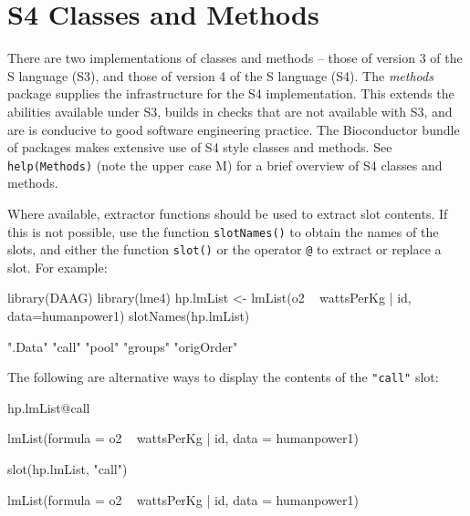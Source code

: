 \documentclass{tufte-book}\usepackage[]{graphicx}\usepackage[]{color}
\newcommand{\txtt}[1]{\texttt{#1}}
\begin{document}
\section{S4 Classes and Methods}\label{sec:s4}
There are two implementations of classes and methods -- those of
version 3 of the S language (S3), and those of version 4 of the S
language (S4).  The \textit{methods} package supplies the
infrastructure for the S4 implementation. This extends the abilities
available under S3, builds in checks that are not available with S3,
and are is conducive to good software engineering practice.  The
Bioconductor bundle of packages makes extensive use of S4 style
classes and methods. See \txtt{help(Methods)} (note the upper case M)
for a brief overview of S4 classes and methods.

Where available, extractor functions should be used to extract slot
contents. If this is not possible, use the function
\txtt{slotNames()} to obtain the names of the slots, and either the
function \txtt{slot()} or the operator \verb!@! to extract or
replace a slot.  For example:
\begin{Schunk}
\begin{Sinput}
library(DAAG)
library(lme4)
hp.lmList <- lmList(o2 ~ wattsPerKg | id,
                    data=humanpower1)
slotNames(hp.lmList)
\end{Sinput}
\begin{Soutput}
[1] ".Data"     "call"      "pool"      "groups"    "origOrder"
\end{Soutput}
\end{Schunk}

The following are alternative ways to display the contents of the
\txtt{"call"} slot:
\begin{fullwidth}
\begin{Schunk}
\begin{Sinput}
hp.lmList@call
\end{Sinput}
\begin{Soutput}
lmList(formula = o2 ~ wattsPerKg | id, data = humanpower1)
\end{Soutput}
\begin{Sinput}
slot(hp.lmList, "call")
\end{Sinput}
\begin{Soutput}
lmList(formula = o2 ~ wattsPerKg | id, data = humanpower1)
\end{Soutput}
\end{Schunk}
\end{fullwidth}
\end{document}
